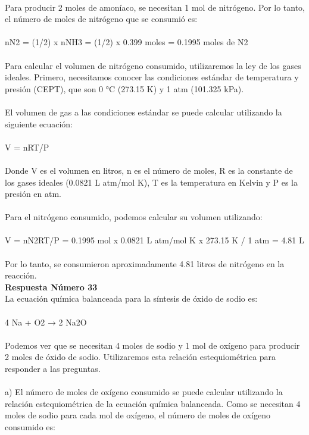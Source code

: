 \documentclass{article}
\begin{document}
\\
Para producir 2 moles de amoníaco, se necesitan 1 mol de nitrógeno. Por lo tanto, el número de moles de nitrógeno que se consumió es:\\
\\
nN2 = (1/2) x nNH3 = (1/2) x 0.399 moles = 0.1995 moles de N2\\
\\
Para calcular el volumen de nitrógeno consumido, utilizaremos la ley de los gases ideales. Primero, necesitamos conocer las condiciones estándar de temperatura y presión (CEPT), que son 0 °C (273.15 K) y 1 atm (101.325 kPa).\\
\\
El volumen de gas a las condiciones estándar se puede calcular utilizando la siguiente ecuación:\\
\\
V = nRT/P\\
\\
Donde V es el volumen en litros, n es el número de moles, R es la constante de los gases ideales (0.0821 L atm/mol K), T es la temperatura en Kelvin y P es la presión en atm.\\
\\
Para el nitrógeno consumido, podemos calcular su volumen utilizando:\\
\\
V = nN2RT/P = 0.1995 mol x 0.0821 L atm/mol K x 273.15 K / 1 atm = 4.81 L\\
\\
Por lo tanto, se consumieron aproximadamente 4.81 litros de nitrógeno en la reacción.\\
\textbf{Respuesta Número 33} \\
La ecuación química balanceada para la síntesis de óxido de sodio es:\\
\\
4 Na + O2 → 2 Na2O\\
\\
Podemos ver que se necesitan 4 moles de sodio y 1 mol de oxígeno para producir 2 moles de óxido de sodio. Utilizaremos esta relación estequiométrica para responder a las preguntas.\\
\\
a) El número de moles de oxígeno consumido se puede calcular utilizando la relación estequiométrica de la ecuación química balanceada. Como se necesitan 4 moles de sodio para cada mol de oxígeno, el número de moles de oxígeno consumido es:\\
\\
\end{document}
